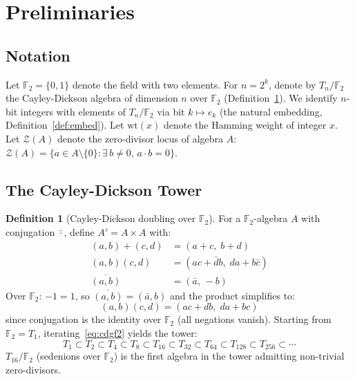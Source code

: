 \documentclass[runningheads]{llncs}
\theoremstyle{plain}
\theoremstyle{definition}
\newtheorem{definition}[theorem]{Definition}
\newcommand{\GFtwo}{\mathbb{F}_2}
\newcommand{\hw}{\mathrm{wt}}
\newcommand{\ZDlocus}{\mathcal{Z}}
\begin{document}


\section{Preliminaries}
\label{sec:prelim}

\subsection{Notation}

Let $\GFtwo = \{0,1\}$ denote the field with two elements.
For $n = 2^k$, denote by $T_n/\GFtwo$ the Cayley-Dickson algebra of
dimension $n$ over $\GFtwo$ (Definition~\ref{def:cd}).
We identify $n$-bit integers with elements of $T_n/\GFtwo$ via
bit $k \mapsto e_k$ (the natural embedding, Definition~\ref{def:embed}).
Let $\hw(x)$ denote the Hamming weight of integer $x$.
Let $\ZDlocus(A)$ denote the zero-divisor locus of algebra $A$:
$\ZDlocus(A) = \{a \in A \setminus \{0\} : \exists\, b \neq 0,\, a \cdot b = 0\}$.

\subsection{The Cayley-Dickson Tower}

\begin{definition}[Cayley-Dickson doubling over $\GFtwo$]
\label{def:cd}
For a $\GFtwo$-algebra $A$ with conjugation $\bar{\cdot}$, define
$A' = A \times A$ with:
\begin{align*}
(a,b) + (c,d) &= (a+c,\; b+d) \\
(a,b)(c,d) &= (ac + \bar{d}b,\; da + b\bar{c}) \\
\overline{(a,b)} &= (\bar{a},\, -b)
\end{align*}
Over $\GFtwo$: $-1 = 1$, so $\overline{(a,b)} = (\bar{a}, b)$ and the
product simplifies to:
\begin{equation}
(a,b)(c,d) = (ac + db,\; da + bc)
\label{eq:cdgf2}
\end{equation}
since conjugation is the identity over $\GFtwo$ (all negations vanish).
Starting from $\GFtwo = T_1$, iterating~\eqref{eq:cdgf2} yields the tower:
\[
T_1 \subset T_2 \subset T_4 \subset T_8 \subset T_{16} \subset T_{32}
\subset T_{64} \subset T_{128} \subset T_{256} \subset \cdots
\]
$T_{16}/\GFtwo$ (sedenions over $\GFtwo$) is the first algebra in the tower
admitting non-trivial zero-divisors.
\end{definition}
\end{document}
